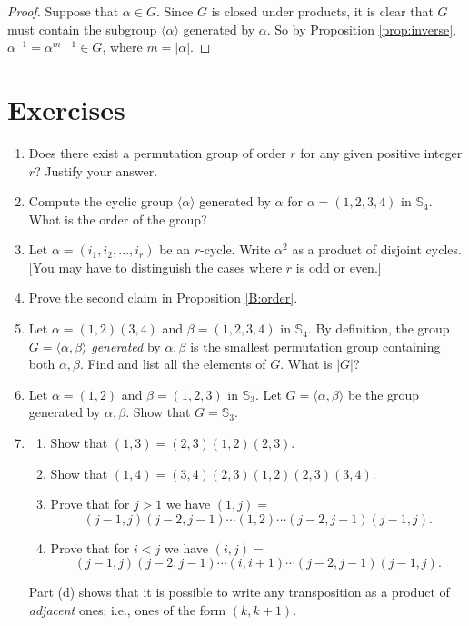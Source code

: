 \documentclass[11pt]{article}
\newenvironment{problems}
{
 \begin{enumerate}[topsep=1pt,itemsep=0pt,parsep=2pt,leftmargin=0.6cm,%
 label={\arabic*.}, ref=\arabic*] \small
}
{
 \end{enumerate}
}
\theoremstyle{definition}
\newcommand{\gen}[1]{\langle #1 \rangle}
\newcommand{\Sym}{\mathbb{S}}
\begin{document}
\begin{proof}
Suppose that $\alpha \in G$. Since $G$ is closed under products, it is
clear that $G$ must contain the subgroup $\gen{\alpha}$ generated by
$\alpha$. So by Proposition \ref{prop:inverse}, $\alpha^{-1} =
\alpha^{m-1} \in G$, where $m = |\alpha|$.
\end{proof}


\section*{Exercises}

\begin{problems}

\item Does there exist a permutation group of order $r$ for any given
  positive integer $r$? Justify your answer.

\item Compute the cyclic group $\gen{\alpha}$ generated by $\alpha$
  for $\alpha = (1,2,3,4)$ in $\Sym_4$. What is the order of the group?

\item Let $\alpha = (i_1, i_2, \dots, i_r)$ be an $r$-cycle. Write
  $\alpha^2$ as a product of disjoint cycles. [You may have to
  distinguish the cases where $r$ is odd or even.]

\item Prove the second claim in Proposition \ref{B:order}. 

\item Let $\alpha = (1,2)(3,4)$ and $\beta = (1,2,3,4)$ in
  $\Sym_4$. By definition, the group $G=\gen{\alpha, \beta}$
  \emph{generated} by $\alpha, \beta$ is the smallest permutation
  group containing both $\alpha, \beta$. Find and list all the
  elements of $G$. What is $|G|$?

\item Let $\alpha = (1,2)$ and $\beta = (1,2,3)$ in $\Sym_3$. Let
  $G=\gen{\alpha, \beta}$ be the group generated by $\alpha,
  \beta$. Show that $G = \Sym_3$. 


\item \label{ex-perm:adjacent} 
 \begin{enumerate}
  \item Show that $(1,3) = (2,3)(1,2)(2,3)$. 
  \item Show that $(1,4) = (3,4)(2,3)(1,2)(2,3)(3,4)$.
  \item Prove that for $j > 1$ we have $(1,j) =$
  $$(j-1,j)(j-2,j-1)\cdots(1,2)\cdots(j-2,j-1)(j-1,j).$$
  \item Prove that for $i < j$ we have $(i,j) =$
  $$(j-1,j)(j-2,j-1)\cdots(i,i+1)\cdots(j-2,j-1)(j-1,j).$$
 \end{enumerate}
 \noindent Part (d) shows that it is possible to write any
  transposition as a product of {\em adjacent} ones; i.e., ones of the
  form $(k,k+1)$.



\end{problems}
\end{document}
